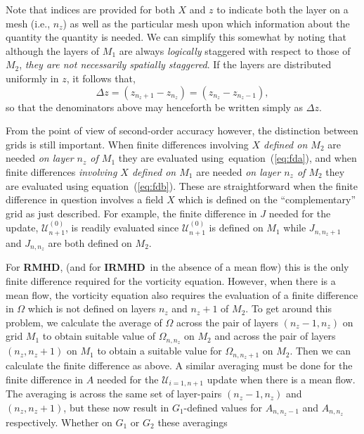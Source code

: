 \documentclass[12pt, letterpaper, oneside, leqno, openright]{memoir}
\newcommand{\irmhd}{\textbf{IRMHD}}
\newcommand{\hrmhd}{\textbf{RMHD}}
\newcommand{\ufield}{\mathscr{U}}
\begin{document}
%
Note that indices are provided for both $X$ and $z$ to indicate both
the layer on a mesh (i.e., $n_z$) as well as the particular mesh upon
which information about the quantity the quantity is needed. We can
simplify this somewhat by noting that although the layers of $M_1$
are always {\em logically} staggered with respect to those of $M_2$,
\textit{ they are not necessarily spatially staggered}. If the layers
are distributed uniformly in $z$, it follows that,
%
\begin{equation}
  \Delta z = (z_{n_z+1}-z_{n_z}) = (z_{n_z} - z_{n_z-1}),
\end{equation}
%
so that the denominators above may henceforth be written simply
as $\Delta z$. 
%
\par
%
From the point of view of second-order accuracy however, the
distinction between grids is still important.  When finite
differences involving \textit{$X$ defined on $M_2$} are
needed \textit{on layer $n_z$ of $M_1$} they are evaluated
using~equation~(\ref{eq:fda}), and when finite differences
\textit{involving $X$ defined on $M_1$} are needed
\textit{on layer $n_z$ of $M_2$} they are evaluated using
equation~(\ref{eq:fdb}). These are straightforward when
the finite difference in question involves a field $X$
which is defined on the ``complementary'' grid as just
described. For example, the finite difference in $J$
needed for the update, $\ufield^{(0)}_{n+1}$, is readily
evaluated since $\ufield^{(0)}_{n+1}$ is defined on $M_1$
while $J_{n,n_z+1}$ and $J_{n,n_z}$ are both defined
on $M_2$.
%
\par 
%
For \hrmhd, (and for \irmhd\ in the absence of a mean flow)
this is the only finite difference required for the vorticity
equation. However, when there is a mean flow, the vorticity
equation also requires the evaluation of a finite difference
in $\Omega$ which is not defined on layers $n_z$ and $n_z+1$
of $M_2$. To get around this problem, we calculate the average
of $\Omega$ across the pair of layers $(n_z-1,n_z)$ on
grid $M_1$ to obtain suitable value of $\Omega_{n,n_z}$ on
$M_2$ and across the pair of layers $(n_z,n_z+1)$ on $M_1$
to obtain a suitable value for $\Omega_{n,n_z+1}$ on $M_2$.
Then we can calculate the finite difference as above. A similar
averaging must be done for the finite difference in $A$
needed for the $\ufield_{i=1,n+1}$ update when there is a
mean flow. The averaging is across the same set of layer-pairs
$(n_z-1,n_z)$ and $(n_z,n_z+1)$, but these now result in
$G_1$-defined values for $A_{n,n_z-1}$ and $A_{n,n_z}$
respectively. Whether on $G_1$ or $G_2$ these averagings
\end{document}
